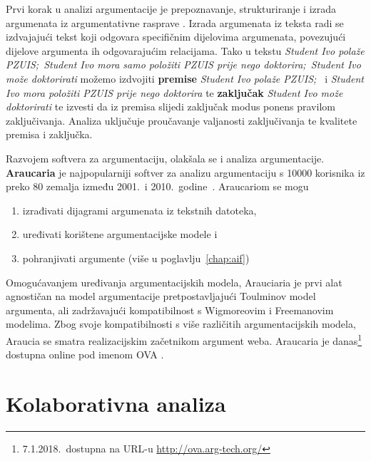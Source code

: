 Prvi korak u analizi argumentacije je prepoznavanje, strukturiranje i 
izrada argumenata iz argumentativne rasprave \citep{scheuer2010computer,
prudencio2005visualizing}. Izrada argumenata iz teksta
radi se izdvajajući tekst koji odgovara
specifičnim dijelovima argumenata, 
povezujući dijelove argumenta ih odgovarajućim relacijama. 
Tako u tekstu \emph{Student
Ivo polaže PZUIS;\ Student Ivo mora samo položiti PZUIS prije nego doktorira;\ Student
Ivo može doktorirati} možemo izdvojiti \textbf{premise} \emph{Student
Ivo polaže PZUIS;\ 
} i 
\emph{Student
Ivo mora položiti PZUIS prije nego doktorira
} te \textbf{zaključak}
\emph{Student Ivo može doktorirati} te izvesti da
iz premisa slijedi zaključak modus ponens pravilom zaključivanja. 
Analiza uključuje 
proučavanje valjanosti zaključivanja te
kvalitete premisa i zaključka.

Razvojem softvera za argumentaciju, 
olakšala se i analiza argumentacije. \textbf{Araucaria}
je najpopularniji softver za analizu argumentaciju s 10000 korisnika iz
preko 80 zemalja između 2001.\ i 2010.\ 
godine~\citep{Chris2017-REETAW}. Araucariom se mogu
\begin{enumerate}
\item izrađivati dijagrami argumenata iz tekstnih datoteka,
\item uređivati korištene argumentacijske modele i 
\item pohranjivati argumente (više u poglavlju~\ref{chap:aif})
\end{enumerate}
Omogućavanjem uređivanja argumentacijskih modela, Arauciaria
je prvi alat agnostičan na model argumentacije
pretpostavljajući Toulminov model argumenta, ali zadržavajući kompatibilnost
s Wigmoreovim \citep{wigmore2016wigmore} i 
Freemanovim \citep{freeman1991dialectics} modelima. 
Zbog svoje kompatibilnosti s više različitih argumentacijskih 
modela, Araucia se smatra realizacijskim začetnikom argument weba.
Araucaria je 
danas\footnote{7.1.2018.\ dostupna na URL-u \url{http://ova.arg-tech.org/}} 
dostupna online pod imenom OVA . 

\section{Kolaborativna analiza}

